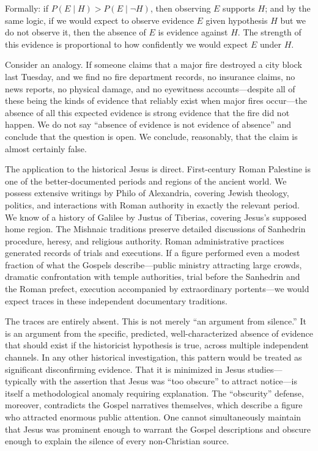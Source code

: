 \documentclass[12pt,oneside]{article}
\begin{document}
Formally: if $P(E \mid H) > P(E \mid \neg H)$, then observing $E$
supports $H$; and by the same logic, if we would expect to observe
evidence $E$ given hypothesis $H$ but we do not observe it, then the
absence of $E$ is evidence against $H$.  The strength of this evidence
is proportional to how confidently we would expect $E$ under $H$.

Consider an analogy.  If someone claims that a major fire destroyed a
city block last Tuesday, and we find no fire department records, no
insurance claims, no news reports, no physical damage, and no
eyewitness accounts---despite all of these being the kinds of evidence
that reliably exist when major fires occur---the absence of all this
expected evidence is strong evidence that the fire did not happen.  We
do not say ``absence of evidence is not evidence of absence'' and
conclude that the question is open.  We conclude, reasonably, that the
claim is almost certainly false.

The application to the historical Jesus is direct.  First-century Roman
Palestine is one of the better-documented periods and regions of the
ancient world.  We possess extensive writings by Philo of Alexandria,
covering Jewish theology, politics, and interactions with Roman
authority in exactly the relevant period.  We know of a history of
Galilee by Justus of Tiberias, covering Jesus's supposed home region.
The Mishnaic traditions preserve detailed discussions of Sanhedrin
procedure, heresy, and religious authority.  Roman administrative
practices generated records of trials and executions.  If a figure
performed even a modest fraction of what the Gospels describe---public
ministry attracting large crowds, dramatic confrontation with temple
authorities, trial before the Sanhedrin and the Roman prefect, execution
accompanied by extraordinary portents---we would expect traces in these
independent documentary traditions.

The traces are entirely absent.  This is not merely ``an argument from
silence.''  It is an argument from the specific, predicted,
well-characterized absence of evidence that should exist if the
historicist hypothesis is true, across multiple independent channels.
In any other historical investigation, this pattern would be treated as
significant disconfirming evidence.  That it is minimized in Jesus
studies---typically with the assertion that Jesus was ``too obscure'' to
attract notice---is itself a methodological anomaly requiring
explanation.  The ``obscurity'' defense, moreover, contradicts the
Gospel narratives themselves, which describe a figure who attracted
enormous public attention.  One cannot simultaneously maintain that
Jesus was prominent enough to warrant the Gospel descriptions and
obscure enough to explain the silence of every non-Christian source.
\end{document}
